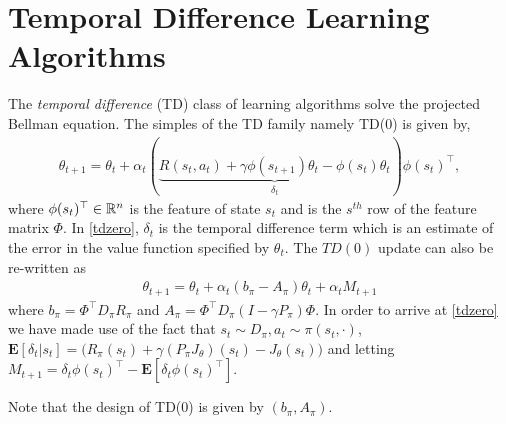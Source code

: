\section{Temporal Difference Learning Algorithms}
The \emph{temporal difference} (TD) class of learning algorithms solve the projected Bellman equation. The simples of the TD family namely TD($0$) is given by,
\begin{align}\label{tdzero}
\theta_{t+1}=\theta_t+\alpha_t(\underbrace{R(s_t,a_t)+\gamma \phi(s_{t+1})\theta_t-\phi(s_t)\theta_t}_{{\delta_t}}){\phi(s_t)}^\top,
\end{align}
where $\phi(s_t)^\top \in \mathbb{R}^n$ is the feature of state $s_t$ and is the $s^{th}$ row of the feature matrix $\Phi$. In \eqref{tdzero}, $\delta_t$ is the temporal difference term which is an estimate of the error in the value function specified by $\theta_t$. The $TD(0)$ update can also be re-written as
\begin{align}\label{tdzero}
\theta_{t+1}=\theta_t+\alpha_t(b_\pi-A_\pi)\theta_t+\alpha_t M_{t+1}
\end{align}
where $b_\pi=\Phi^\top D_\pi R_\pi$ and $A_\pi=\Phi^\top D_\pi (I-\gamma P_\pi)\Phi$. In order to arrive at \eqref{tdzero} we have made use of the fact that $s_t\sim D_\pi, a_t\sim\pi(s_t,\cdot)$, $\mathbf{E}[\delta_t|s_t]= \big(R_\pi(s_t)+\gamma (P_\pi J_\theta)(s_t) -J_\theta(s_t)\big)$ and letting $M_{t+1}=\delta_t\phi(s_t)^\top-\mathbf{E}[\delta_t{\phi(s_t)}^\top]$.\par
Note that the design of TD($0$) is given by $(b_\pi,A_\pi)$.
